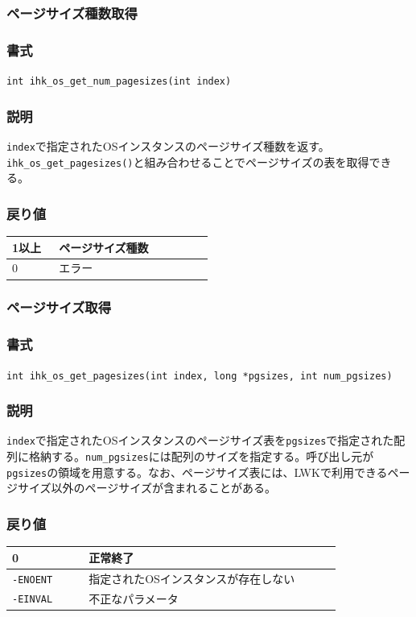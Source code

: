 \documentclass[twoside,11pt,fleqn]{book}
\begin{document}
\subsubsection{ページサイズ種数取得}
\subsubsection*{書式}{\quad} \texttt{int ihk\_os\_get\_num\_pagesizes(int index)}
\subsubsection*{説明}{\quad} \texttt{index}で指定されたOSインスタンスのページサイズ種数を返す。
\texttt{ihk\_os\_get\_pagesizes()}と組み合わせることでページサイズの表を取得できる。

\subsubsection*{戻り値}
\begin{table}[!h]
\footnotesize
\begin{tabular}{|p{0.20\linewidth}|p{0.66\linewidth}|} \hline
1以上&ページサイズ種数\\ \hline
0&エラー\\ \hline
\end{tabular}
\vspace{-0em}
\end{table}
\FloatBarrier

\subsubsection{ページサイズ取得}
\subsubsection*{書式}{\quad} \texttt{int ihk\_os\_get\_pagesizes(int index, long *pgsizes, int num\_pgsizes)}
\subsubsection*{説明}{\quad} \texttt{index}で指定されたOSインスタンスのページサイズ表を\texttt{pgsizes}で指定された配列に格納する。\texttt{num\_pgsizes}には配列のサイズを指定する。呼び出し元が\texttt{pgsizes}の領域を用意する。なお、ページサイズ表には、LWKで利用できるページサイズ以外のページサイズが含まれることがある。
\subsubsection*{戻り値}
\begin{table}[!h]
\footnotesize
\begin{tabular}{|p{0.20\linewidth}|p{0.66\linewidth}|} \hline
0&正常終了\\ \hline
\texttt{-ENOENT}&指定されたOSインスタンスが存在しない\\ \hline
\texttt{-EINVAL}&不正なパラメータ\\ \hline
\end{tabular}
\vspace{-0em}
\end{table}
\FloatBarrier
\end{document}

